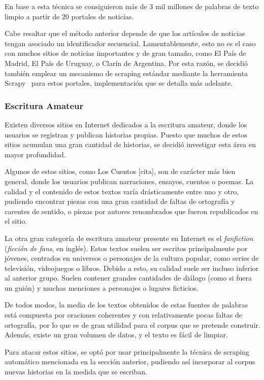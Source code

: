 En base a esta técnica se consiguieron más de 3 mil millones de palabras de texto limpio a partir de
20 portales de noticias.


Cabe resaltar que el método anterior depende de que los artículos de noticias tengan asociado un
identificador secuencial. Lamentablemente, esto no es el caso con muchos sitios de noticias
importantes y de gran tamaño, como El País de Madrid, El País de Uruguay, o Clarín de Argentina. Por
esta razón, se decidió también emplear un mecanismo de scraping estándar mediante la herramienta
Scrapy~\cite{Scrapy} para estos portales, implementación que se detalla más adelante.


\subsubsection{Escritura Amateur}

Existen diversos sitios en Internet dedicados a la escritura amateur, donde los usuarios se
registran y publican historias propias. Puesto que muchos de estos sitios acumulan una gran cantidad
de historias, se decidió investigar esta área en mayor profundidad.

Algunos de estos sitios, como Los Cuentos [cita], son de carácter más bien general, donde los
usuarios publican narraciones, ensayos, cuentos o poemas. La calidad y el contenido de estos textos
varía drásticamente entre uno y otro, pudiendo encontrar piezas con una gran cantidad de faltas de
ortografía y carentes de sentido, o piezas por autores renombrados que fueron republicados en el
sitio.

La otra gran categoría de escritura amateur presente en Internet es el \textit{fanfiction}
(\textit{ficción de fans}, en inglés). Estos textos suelen ser escritos principalmente por jóvenes,
centrados en universos o personajes de la cultura popular, como series de televisión, videojuegos o
libros. Debido a esto, su calidad suele ser incluso inferior al anterior grupo. Suelen contener
grandes cantidades de diálogo (como si fuera un guión) y muchas menciones a personajes o lugares
ficticios.

De todos modos, la media de los textos obtenidos de estas fuentes de palabras está compuesta por
oraciones coherentes y con relativamente pocas faltas de ortografía, por lo que es de gran utilidad
para el corpus que se pretende construir. Además, existe un gran volumen de datos, y el texto es
fácil de limpiar.

Para atacar estos sitios, se optó por usar principalmente la técnica de scraping automático
mencionada en la sección anterior, pudiendo así incorporar al corpus nuevas historias en la medida
que se escriban.


